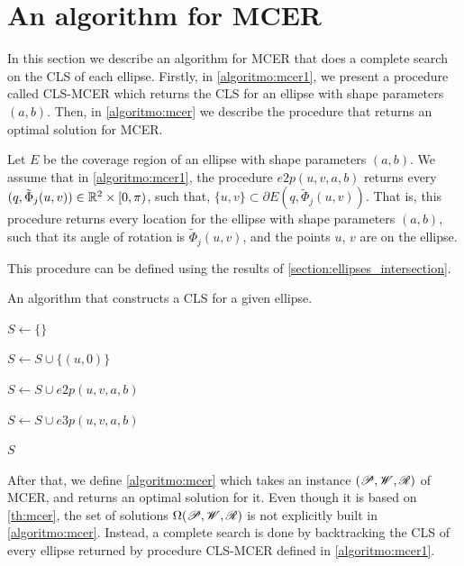 \section{An algorithm for MCER}

In this section we describe an algorithm for MCER that does a complete search on the CLS of each ellipse.
Firstly, in \autoref{algoritmo:mcer1}, we present a procedure called CLS-MCER which returns the CLS for an ellipse with shape parameters $(a, b)$. Then, in \autoref{algoritmo:mcer} we describe the procedure that returns an optimal solution for MCER.

Let $E$ be the coverage region of an ellipse with shape parameters $(a, b)$. We assume that in \autoref{algoritmo:mcer1}, the procedure $e2p(u, v, a, b)$ returns every $(q, \tilde{\Phi}_j(u,v)) \in \mathbb{R}^2\times[0, \pi)$, such that, $\{u, v\}\subset \partial E(q, \tilde{\Phi}_j(u,v))$. That is, this procedure returns every location for the ellipse with shape parameters $(a, b)$, such that its angle of rotation is $\tilde{\Phi}_j(u,v)$, and the points $u$, $v$ are on the ellipse.


This procedure can be defined using the results of \autoref{section:ellipses_intersection}.

\begin{algoritmo}
	\caption{An algorithm that constructs a CLS for a given ellipse.}\label{algoritmo:mcer1}
	\begin{algorithmic}[1]
		
		
		\item[]
		
		\State $S \gets \{\}$
		
		\State $S \gets S \cup \{(u, 0)\}$
		\EndFor
		
		\State $S \gets S \cup e2p(u, v, a, b)$
		\EndFor
		
		\State $S \gets S \cup e3p(u, v, a, b)$ 
		\EndFor
		
		\State \Return $S$
		\EndProcedure
	\end{algorithmic}
\end{algoritmo}

After that, we define \autoref{algoritmo:mcer} which takes an instance $(\mathscr{P}, \mathscr{W}, \mathscr{R})$ of MCER, and returns an optimal solution for it.
Even though it is based on \autoref{th:mcer}, the set of solutions $\Omega(\mathscr{P}, \mathscr{W}, \mathscr{R})$ is not explicitly built in \autoref{algoritmo:mcer}. Instead, a complete search is done by backtracking the CLS of every ellipse returned by procedure CLS-MCER defined in \autoref{algoritmo:mcer1}.

